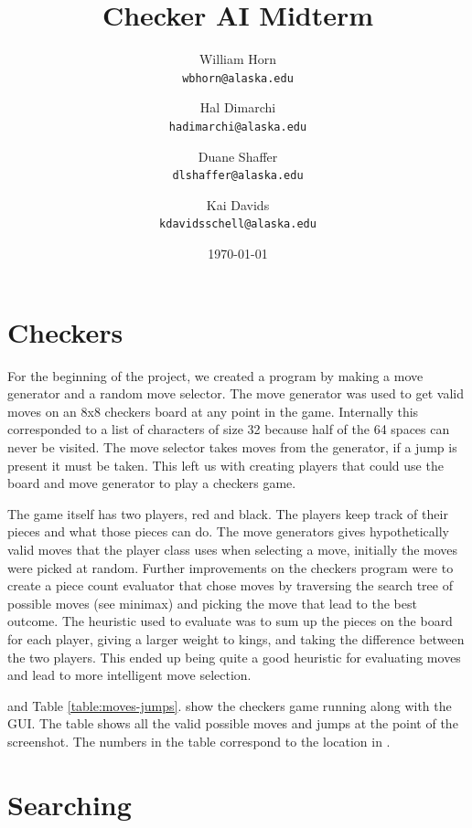 \documentclass{article}
\begin{document}
\title{Checker AI Midterm}
\author{
  William Horn\\
  \texttt{wbhorn@alaska.edu}
  \and
  Hal Dimarchi\\
  \texttt{hadimarchi@alaska.edu}
  \and
  Duane Shaffer\\
  \texttt{dlshaffer@alaska.edu}
  \and
  Kai Davids\\
  \texttt{kdavidsschell@alaska.edu}
}
\date{\today}
\maketitle

\section{Checkers}

For the beginning of the project, we created a program by making a
move generator and a random move selector. The move generator was used to get
valid moves on an 8x8 checkers board at any point in the game. Internally this
corresponded to a list of characters of size 32 because half of the 64 spaces
can never be visited. The move selector takes moves from the generator, if a
jump is present it must be taken. This left us with creating players that could
use the board and move generator to play a checkers game.

The game itself has two players, red and black. The players keep track of their pieces and what
those pieces can do. The move generators gives hypothetically valid moves that
the player class uses when selecting a move, initially the moves were picked at
random. Further improvements on the checkers program were to create a piece
count evaluator that chose moves by traversing the search tree of possible
moves (see minimax) and picking the move that lead to the best outcome. The
heuristic used to evaluate was to sum up the pieces on the board for each
player, giving a larger weight to kings, and taking the difference between the
two players. This ended up being quite a good heuristic for evaluating moves
and lead to more intelligent move selection.

 and Table \ref{table:moves-jumps}. show the checkers game running along with the GUI.
The table shows all the valid possible moves and jumps at the point of the
screenshot. The numbers in the table correspond to the location in .

\section{Searching}
\end{document}
